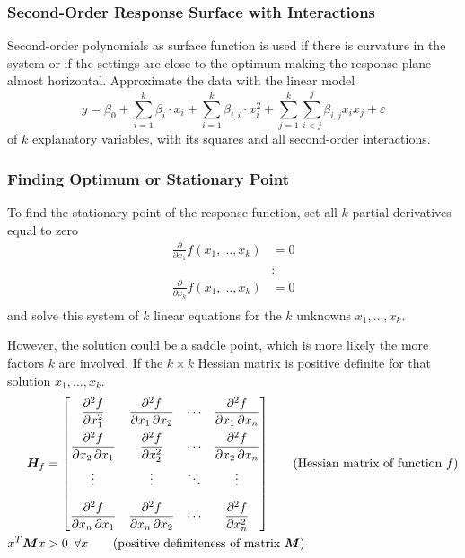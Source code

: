 \documentclass[11pt]{article}
\theoremstyle{definition}
\begin{document}
\subsubsection{Second-Order Response Surface with Interactions}
Second-order polynomials as surface function is used if there is curvature in the system or if the settings are close to the optimum making the response plane almost horizontal. Approximate the data with the linear model
\begin{equation*}
	y = \beta_0 + \sum_{i=1}^k\beta_i\cdot x_i + \sum_{i=1}^{k}\beta_{i,i}\cdot x_i^2 + \sum_{j=1}^k\sum_{i<j}^j\beta_{i,j}x_i x_j + \varepsilon
\end{equation*}
of $k$ explanatory variables, with its squares and all second-order interactions.

\subsubsection{Finding Optimum or Stationary Point}
To find the stationary point of the response function, set all $k$ partial derivatives equal to zero
\begin{align*}
	\frac{\partial}{\partial x_1}f(x_1,\dots,x_k) &= 0\\
	&\vdots\\
	\frac{\partial}{\partial x_k}f(x_1,\dots,x_k) &= 0\\
\end{align*}
and solve this system of $k$ linear equations for the $k$ unknowns $x_1,\dots,x_k$.

However, the solution could be a saddle point, which is more likely the more factors $k$ are involved. If the $k\times k$ Hessian matrix is positive definite for that solution $x_1,\dots,x_k$.
\begin{align*}
	\bm{H}_f &= {\begin{bmatrix}{\dfrac {\partial ^{2}f}{\partial x_{1}^{2}}}&{\dfrac {\partial ^{2}f}{\partial x_{1}\,\partial x_{2}}}&\cdots &{\dfrac {\partial ^{2}f}{\partial x_{1}\,\partial x_{n}}}\\[2.2ex]{\dfrac {\partial ^{2}f}{\partial x_{2}\,\partial x_{1}}}&{\dfrac {\partial ^{2}f}{\partial x_{2}^{2}}}&\cdots &{\dfrac {\partial ^{2}f}{\partial x_{2}\,\partial x_{n}}}\\[2.2ex]\vdots &\vdots &\ddots &\vdots \\[2.2ex]{\dfrac {\partial ^{2}f}{\partial x_{n}\,\partial x_{1}}}&{\dfrac {\partial ^{2}f}{\partial x_{n}\,\partial x_{2}}}&\cdots &{\dfrac {\partial ^{2}f}{\partial x_{n}^{2}}}\end{bmatrix}} \tag{Hessian matrix of function $f$}\\
	x^T\bm{M}x &> 0\hspace*{0.5em}\forall x \tag{positive definiteness of matrix $\bm{M}$}
\end{align*}
\end{document}
